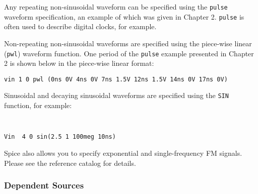 Any repeating non-sinusoidal waveform can be specified using the
{\tt pulse} waveform specification, an example of which was
given in Chapter 2.  {\tt pulse} is often used to describe digital clocks,
for example.

Non-repeating non-sinusoidal waveforms are specified
using the piece-wise linear ({\tt pwl}) waveform function.
One period of the {\tt pulse} example presented in Chapter 2 is
shown below in the piece-wise linear format:\\
\centerline{}
\begin{center}
{\tt vin 1 0 pwl (0ns 0V 4ns 0V 7ns 1.5V 12ns 1.5V 14ns 0V 17ns 0V)}
\end{center}


\vfil\eject
Sinusoidal and decaying sinusoidal waveforms are specified
using the {\tt SIN} function, for example:
{\tt
\begin{verbatim}
Vin  4 0 sin(2.5 1 100meg 10ns)
\end{verbatim} }
\centerline{}
\vspace{3mm}\par\noindent
Spice also allows you to specify exponential and single-frequency FM
signals.  Please see the reference catalog for details.

\subsubsection{Dependent Sources}

